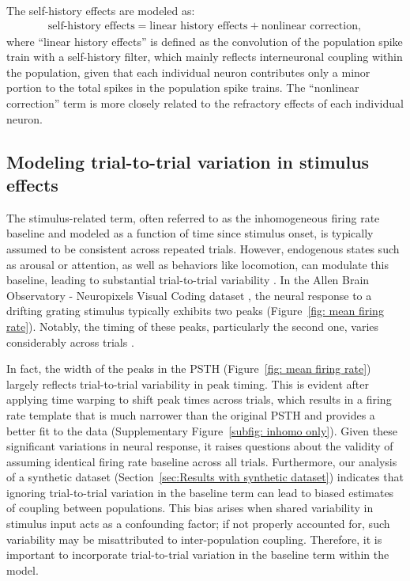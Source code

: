 \documentclass[12pt]{article}
\begin{document}
The self-history effects are modeled as:
\begin{align*}
\text{self-history effects} = \text{linear history effects} + \text{nonlinear correction},
\end{align*}
where ``linear history effects'' is defined as the convolution of the population spike train with a self-history filter, which mainly reflects interneuronal coupling within the population, given that each individual neuron contributes only a minor portion to the total spikes in the population spike trains. The ``nonlinear correction'' term is more closely related to the refractory effects of each individual neuron. 


\subsection{Modeling trial-to-trial variation in stimulus effects}
\label{sec:Modeling trial-to-trial variation in stimulus effects}

The stimulus-related term, often referred to as the inhomogeneous firing rate baseline and modeled as a function of time since stimulus onset, is typically assumed to be consistent across repeated trials. However, endogenous states such as arousal or attention, as well as behaviors like locomotion, can modulate this baseline, leading to substantial trial-to-trial variability \cite{international2023brain, musall2019single, stringer2019spontaneous, williams2021statistical, cowley2020slow}. In the Allen Brain Observatory - Neuropixels Visual Coding dataset \cite{allendata}, the neural response to a drifting grating stimulus typically exhibits two peaks (Figure~\ref{fig: mean firing rate}). Notably, the timing of these peaks, particularly the second one, varies considerably across trials \cite{chen2022population, olarinre2025relative}.

In fact, the width of the peaks in the PSTH (Figure~\ref{fig: mean firing rate}) largely reflects trial-to-trial variability in peak timing. This is evident after applying time warping to shift peak times across trials, which results in a firing rate template that is much narrower than the original PSTH and provides a better fit to the data (Supplementary Figure~\ref{subfig: inhomo only}). Given these significant variations in neural response, it raises questions about the validity of assuming identical firing rate baseline across all trials. Furthermore, our analysis of a synthetic dataset (Section~\ref{sec:Results with synthetic dataset}) indicates that ignoring trial-to-trial variation in the baseline term can lead to biased estimates of coupling between populations. This bias arises when shared variability in stimulus input acts as a confounding factor; if not properly accounted for, such variability may be misattributed to inter-population coupling. Therefore, it is important to incorporate trial-to-trial variation in the baseline term within the model.
\end{document}
